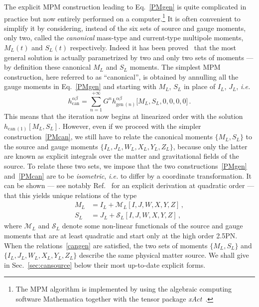 \documentclass[prd,preprint,superscriptaddress,tightenlines,nofootinbib,
  eqsecnum,showpacs]{revtex4}
\begin{document}
The explicit MPM construction leading to Eq.~\eqref{PMgen} is quite
complicated in practice but now entirely performed  on a
computer.\footnote{The MPM algorithm is implemented by using the
  algebraic computing software Mathematica together with the tensor
  package \textit{xAct}~\cite{xtensor}.}  It is often convenient to
simplify it by considering, instead of the six sets of source and
gauge moments, only two, called the \textit{canonical} mass-type and
current-type multipole moments, $M_L(t)$ and $S_L(t)$
respectively. Indeed it has been proved~\cite{Th80, BD86} that the
most general solution is actually parametrized by two and only two
sets of moments --- by definition these canonical $M_L$ and $S_L$
moments. The simplest MPM construction, here referred to as
``canonical'', is obtained by annulling all the gauge moments in
Eq.~\eqref{PMgen} and starting with $M_L$, $S_L$ in place of $I_L$,
$J_L$, \textit{i.e.}
%
\begin{equation} \label{PMcan}
h_\text{can}^{\alpha\beta} = \sum_{n=1}^{+\infty} G^n
h_{\mathrm{gen}\,(n)}^{\alpha\beta}\bigl[M_L,S_L,0,0,0,0\bigr]\,.
\end{equation}
%
This means that the iteration now begins at linearized order with the
solution $h_{\mathrm{can}\,(1)}[M_L,S_L]$. However, even if we proceed
with the simpler construction~\eqref{PMcan}, we still have to relate
the canonical moments $\{M_L, S_L\}$ to the source and gauge moments
$\{I_L, J_L, W_L, X_L, Y_L, Z_L\}$, because only the latter are known
as explicit integrals over the matter and gravitational fields of the
source. To relate these two sets, we impose that the two
constructions~\eqref{PMgen} and~\eqref{PMcan} are to be
\textit{isometric}, \textit{i.e.} to differ by a coordinate
transformation. It can be shown --- see notably Ref.~\cite{BFIS08} for
an explicit derivation at quadratic order --- that this yields unique
relations of the type
%
\begin{subequations}\label{cangen}
\begin{align}
M_L &= I_L + \mathcal{M}_L\left[I, J, W, X, Y, Z\right]\,,\\ S_L &=
J_L + \mathcal{S}_L\left[I, J, W, X, Y, Z\right]\,,
\end{align}
\end{subequations}
%
where $\mathcal{M}_L$ and $\mathcal{S}_L$ denote some non-linear
functionals of the source and gauge moments that are at least
quadratic and start only at the high order 2.5PN. When the
relations~\eqref{cangen} are satisfied, the two sets of moments
$\{M_L, S_L\}$ and $\{I_L, J_L, W_L, X_L, Y_L, Z_L\}$ describe the
same physical matter source. We shall give in Sec.~\ref{sec:cansource}
below their most up-to-date explicit forms.
\end{document}
